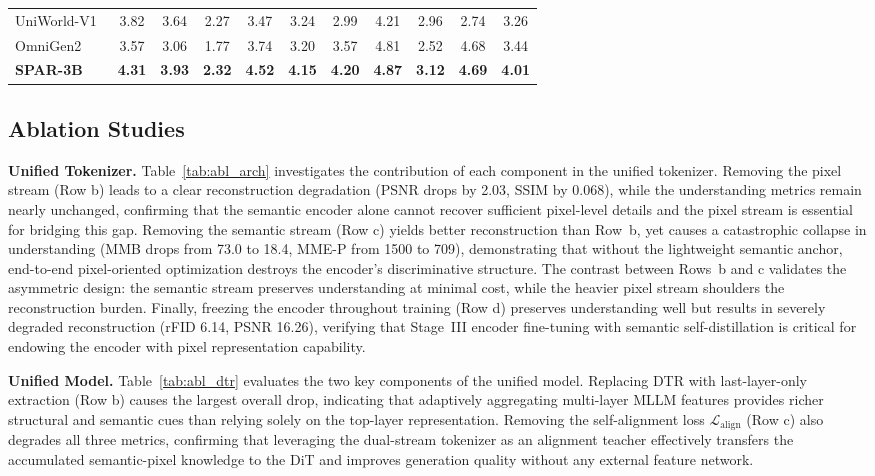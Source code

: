 \documentclass[runningheads]{llncs}
\begin{document}
\begin{table}[t]
\begin{tabular}{lcccccccccc}
UniWorld-V1~\cite{lin2025uniworld} & 3.82 & 3.64 & 2.27 & 3.47 & 3.24 & 2.99 & 4.21 & 2.96 & 2.74 & 3.26 \\
OmniGen2~\cite{wu2025omnigen2} & 3.57 & 3.06 & 1.77 & 3.74 & 3.20 & 3.57 & 4.81 & 2.52 & {4.68} & 3.44 \\
\rowcolor[HTML]{EFEFEF} \textbf{SPAR-3B} & \textbf{4.31} & \textbf{3.93} & \textbf{2.32} & \textbf{4.52} & \textbf{4.15} & \textbf{4.20} & \textbf{4.87} & \textbf{3.12} & \textbf{4.69} & \textbf{4.01} \\
\bottomrule
\end{tabular}
\label{tab:imgedit}
\end{table}




\subsection{Ablation Studies}

\noindent\textbf{Unified Tokenizer.}
Table~\ref{tab:abl_arch} investigates the contribution of each component in the unified tokenizer. Removing the pixel stream (Row b) leads to a clear reconstruction degradation (PSNR drops by 2.03, SSIM by 0.068), while the understanding metrics remain nearly unchanged, confirming that the semantic encoder alone cannot recover sufficient pixel-level details and the pixel stream is essential for bridging this gap. Removing the semantic stream (Row c) yields better reconstruction than Row~b, yet causes a catastrophic collapse in understanding (MMB drops from 73.0 to 18.4, MME-P from 1500 to 709), demonstrating that without the lightweight semantic anchor, end-to-end pixel-oriented optimization destroys the encoder's discriminative structure. The contrast between Rows~b and c validates the asymmetric design: the semantic stream preserves understanding at minimal cost, while the heavier pixel stream shoulders the reconstruction burden. Finally, freezing the encoder throughout training (Row d) preserves understanding well but results in severely degraded reconstruction (rFID 6.14, PSNR 16.26), verifying that Stage~III encoder fine-tuning with semantic self-distillation is critical for endowing the encoder with pixel representation capability.



\noindent\textbf{Unified Model.}
Table~\ref{tab:abl_dtr} evaluates the two key components of the unified model. Replacing DTR with last-layer-only extraction (Row b) causes the largest overall drop, indicating that adaptively aggregating multi-layer MLLM features provides richer structural and semantic cues than relying solely on the top-layer representation. Removing the self-alignment loss $\mathcal{L}_{\text{align}}$ (Row c) also degrades all three metrics, confirming that leveraging the dual-stream tokenizer as an alignment teacher effectively transfers the accumulated semantic-pixel knowledge to the DiT and improves generation quality without any external feature network.
\end{document}
